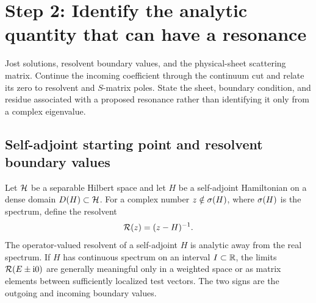 \section{Step 2: Identify the analytic quantity that can have a resonance}
\label{sec:resonance-definition}

\calculationroute
  {Jost solutions, resolvent boundary values, and the physical-sheet
  scattering matrix.}
  {Continue the incoming coefficient through the continuum cut and relate its
  zero to resolvent and $S$-matrix poles.}
  {State the sheet, boundary condition, and residue associated with a proposed
  resonance rather than identifying it only from a complex eigenvalue.}

\subsection{Self-adjoint starting point and resolvent boundary values}
\label{subsec:resolvent}

Let $\mathcal{H}$ be a separable Hilbert space and let $H$ be a self-adjoint
Hamiltonian on a dense domain $D(H)\subset\mathcal{H}$.  For a complex number
$z\notin\sigma(H)$, where $\sigma(H)$ is the spectrum, define the resolvent
\begin{equation}
  \mathcal{R}(z)=(z-H)^{-1} .
  \label{eq:resolvent-definition}
\end{equation}
The operator-valued resolvent of a self-adjoint $H$ is analytic away from the
real spectrum.  If $H$ has continuous spectrum on an interval $I\subset
\mathbb{R}$, the limits $\mathcal{R}(E\pm\mathrm{i}0)$ are generally meaningful only in a
weighted space or as matrix elements between sufficiently localized test
vectors.  The two signs are the outgoing and incoming boundary values.

